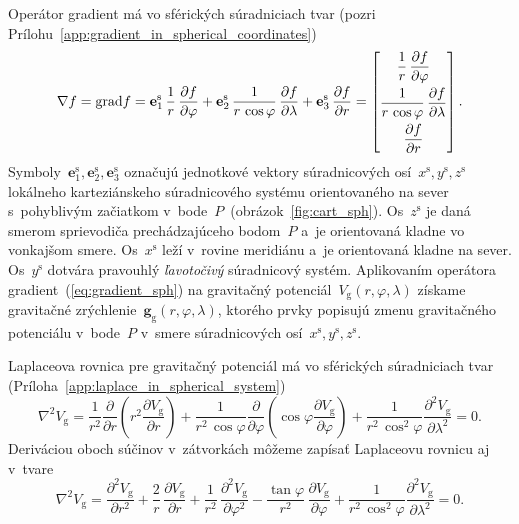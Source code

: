 \documentclass[a4paper, 12pt]{book}
\newcommand{\grad}{\mathrm{grad}}
\newcommand{\gidx}{\mathrm g}
\let\vec\mathbf
\begin{document}
Operátor gradient má vo sférických súradniciach tvar (pozri 
Prílohu~\ref{app:gradient_in_spherical_coordinates})
%
\begin{equation}
\label{eq:gradient_sph}
\nabla f = \grad f = \vec e_1^\mathrm{s} \, \frac{1}{r} \, \frac{\partial 
f}{\partial \varphi} + \vec e_2^\mathrm{s} \, \frac{1}{r \, \cos\varphi} \, 
\frac{\partial f}{\partial \lambda} + \vec e_3^\mathrm{s} \, \frac{\partial 
f}{\partial r}\\
%
=
%
\begin{bmatrix}
\dfrac{1}{r} \, \dfrac{\partial f}{\partial \varphi} \\[2ex]
\dfrac{1}{r \, \cos\varphi} \, \dfrac{\partial f}{\partial \lambda}\\[2ex]
\dfrac{\partial f}{\partial r}
\end{bmatrix}
{.}
\end{equation}
%
Symboly~$\vec{e}_1^\mathrm{s}, \vec{e}_2^{\mathrm{s}}, \vec{e}_3^\mathrm{s}$ 
označujú jednotkové vektory súradnicových osí~$x^\mathrm{s}, y^\mathrm{s}, 
z^\mathrm{s}$ lokálneho karteziánskeho súradnicového systému orientovaného na 
sever s~pohyblivým začiatkom v~bode~$P$~(obrázok~\ref{fig:cart_sph}).  
Os~$z^\mathrm{s}$ je daná smerom sprievodiča prechádzajúceho bodom~$P$ a~je 
orientovaná kladne vo vonkajšom smere.  Os~$x^\mathrm{s}$ leží v~rovine 
meridiánu a~je orientovaná kladne na sever.  Os~$y^\mathrm{s}$ dotvára 
pravouhlý \emph{ľavotočivý} súradnicový systém.  Aplikovaním operátora 
gradient~(\ref{eq:gradient_sph}) na gravitačný potenciál~$V_\gidx(r, \varphi, 
\lambda)$ získame gravitačné zrýchlenie~$\vec g_\gidx(r, \varphi, \lambda)$, 
ktorého prvky popisujú zmenu gravitačného potenciálu v~bode~$P$ v~smere 
súradnicových osí~$x^\mathrm{s}, y^\mathrm{s}, z^\mathrm{s}$.

Laplaceova rovnica pre gravitačný potenciál má vo sférických súradniciach tvar 
(Príloha~\ref{app:laplace_in_spherical_system})
%
\begin{equation}
\label{eq:vg_laplace_sph}
\nabla^2 V_\gidx = \frac{1}{r^2} \frac{\partial}{\partial r} \left( r^2 
\frac{\partial V_\gidx}{\partial r} \right) + \frac{1}{r^2 \, \cos\varphi} 
\frac{\partial}{\partial \varphi} \left( \cos\varphi \frac{\partial 
V_\gidx}{\partial \varphi} \right) + \frac{1}{r^2 \, 
\cos^2\varphi}\frac{\partial^2 V_\gidx}{\partial \lambda^2} = 0{.}
\end{equation}
%
Deriváciou oboch súčinov v~zátvorkách môžeme zapísať Laplaceovu rovnicu aj 
v~tvare
%
\begin{equation}
\label{eq:vg_laplace_sph2}
\nabla^2 V_\gidx = \frac{\partial^2 V_\gidx}{\partial r^2} + \frac{2}{r} \, 
\frac{\partial V_\gidx}{\partial r} + \frac{1}{r^2} \, \frac{\partial^2 
V_\gidx}{\partial \varphi^2} - \frac{\tan\varphi}{r^2} \, \frac{\partial 
V_\gidx}{\partial \varphi} + \frac{1}{r^2 \,
\cos^2\varphi}\frac{\partial^2 V_\gidx}{\partial \lambda^2} = 0{.}
\end{equation}
\end{document}
